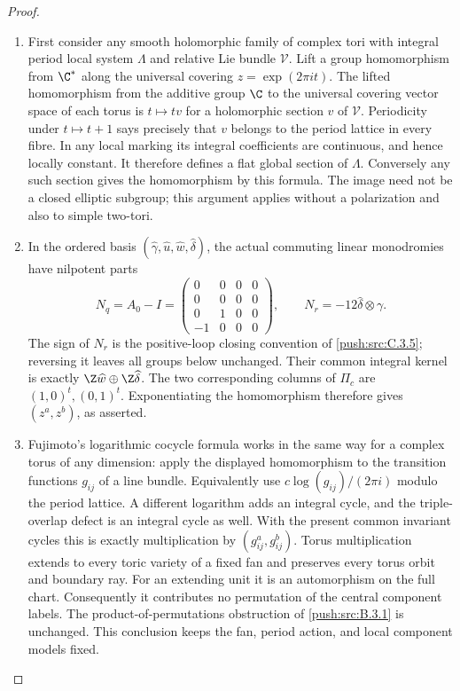\begin{proof}
\begin{enumerate}[label=\arabic*.,leftmargin=*]
\item First consider any smooth holomorphic family of
complex tori with integral period local system
$\Lambda$ and relative Lie bundle $\mathcal V$.
Lift a group homomorphism from $\C^*$ along the
universal covering $z=\exp(2\pi i t)$.
The lifted homomorphism from the additive group
$\C$ to the universal covering vector space of
each torus is $t\mapsto t v$ for a holomorphic
section $v$ of $\mathcal V$.  Periodicity under
$t\mapsto t+1$ says precisely that $v$ belongs
to the period lattice in every fibre.  In any
local marking its integral coefficients are
continuous, and hence locally constant.  It
therefore defines a flat global section of
$\Lambda$.  Conversely any such section gives
the homomorphism by this formula.  The image
need not be a closed elliptic subgroup; this
argument applies without a polarization and
also to simple two-tori.

\item In the ordered basis
$(\widehat\gamma,\widehat u,\widehat w,\widehat\delta)$,
the actual commuting linear monodromies have
nilpotent parts
\[
 N_q=A_0-I=
 \begin{pmatrix}
 0&0&0&0\\0&0&0&0\\0&1&0&0\\-1&0&0&0
 \end{pmatrix},\qquad
 N_r=-12\widehat\delta\otimes\gamma.
\]
The sign of $N_r$ is the positive-loop closing
convention of \ref{push:src:C.3.5}; reversing it leaves all
groups below unchanged.  Their common integral
kernel is exactly $\Z\widehat w\oplus\Z\widehat\delta$.
The two corresponding columns of $\Pi_c$ are
$(1,0)^t,(0,1)^t$.  Exponentiating the homomorphism
therefore gives $(z^a,z^b)$, as asserted.

\item Fujimoto's logarithmic cocycle formula
\citep[Definition 1.1]{Fujimoto1990AB} works in
the same way for a complex torus of any dimension:
apply the displayed homomorphism to the transition
functions $g_{ij}$ of a line bundle.  Equivalently
use $c\log(g_{ij})/(2\pi i)$ modulo the period
lattice.  A different logarithm adds an integral
cycle, and the triple-overlap defect is an
integral cycle as well.  With the present common
invariant cycles this is exactly multiplication
by $(g_{ij}^a,g_{ij}^b)$.  Torus multiplication
extends to every toric variety of a fixed fan
and preserves every torus orbit and boundary
ray.  For an extending unit it is an automorphism
on the full chart.  Consequently it contributes
no permutation of the central component labels.
The product-of-permutations obstruction of \ref{push:src:B.3.1}
is unchanged.  This conclusion keeps the fan,
period action, and local component models fixed.


\end{enumerate}
\end{proof}
